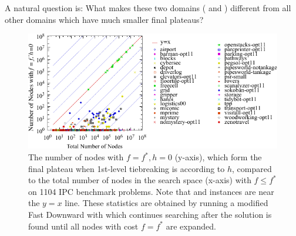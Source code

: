 A natural question is:  What makes these two domains
( and )  different from all other domains
which have much smaller final plateaus?

\begin{figure}[htbp]
   \centering
  \includegraphics{tables/aaai16-frontier/aaai16prelim3/lmcut_frontier-front.pdf}
  \caption{
 The number of nodes with $f=f^*, h=0$ (y-axis), which form
  the final plateau when 1st-level tiebreaking is according to $h$, compared to
  the total number of nodes in the search space (x-axis) with $f\leq
  f^*$ on 1104 IPC benchmark problems.  Note that 
  and  instances are near the $y=x$ line.
  These statistics are obtained by running a modified Fast Downward with
 \lmcut which continues searching after the solution is found
 until all nodes with cost $f=f^*$ are expanded.} \label{fig:plateau}
\end{figure}

